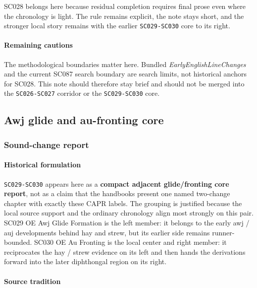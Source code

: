 \documentclass[
  british,
  a4paper,
]{article}
\begin{document}
SC028 belongs here because residual completion requires final prose even
where the chronology is light. The rule remains explicit, the note stays
short, and the stronger local story remains with the earlier
\texttt{SC029-SC030} core to its right.

\paragraph{Remaining cautions}\label{remaining-cautions-20}

The methodological boundaries matter here. Bundled
\emph{EarlyEnglishLineChanges} and the current SC087 search boundary are
search limits, not historical anchors for SC028. This note should
therefore stay brief and should not be merged into the
\texttt{SC026-SC027} corridor or the \texttt{SC029-SC030} core.

\subsection{Awj glide and au-fronting
core}\label{awj-glide-and-au-fronting-core}

\subsubsection{Sound-change report}\label{sound-change-report-21}

\paragraph{Historical formulation}\label{historical-formulation-21}

\texttt{SC029-SC030} appears here as a \textbf{compact adjacent
glide/fronting core report}, not as a claim that the handbooks present
one named two-change chapter with exactly these CAPR labels. The
grouping is justified because the local source support and the ordinary
chronology align most strongly on this pair. SC029 OE Awj Glide
Formation is the left member: it belongs to the early awj / auj
developments behind hay and strew, but its earlier side remains
runner-bounded. SC030 OE Au Fronting is the local center and right
member: it reciprocates the hay / strew evidence on its left and then
hands the derivations forward into the later diphthongal region on its
right.

\paragraph{Source tradition}\label{source-tradition-21}
\end{document}
